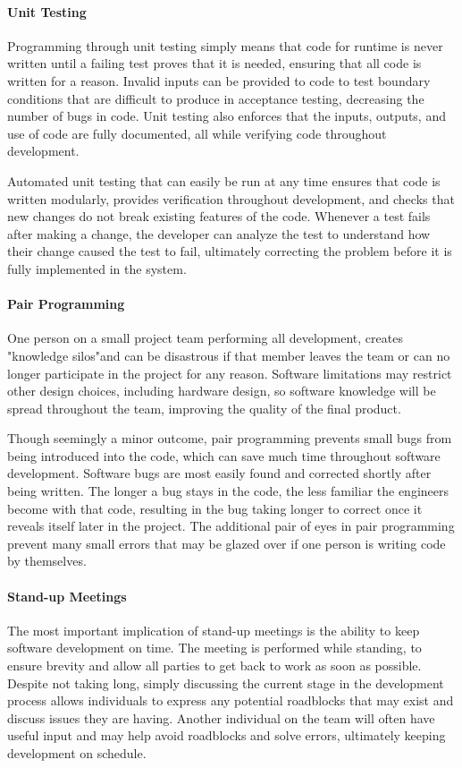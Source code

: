 \paragraph{Unit Testing}
Programming through unit testing simply means that code for runtime is never written until a failing test proves that it is needed, ensuring that all code is written for a reason.
Invalid inputs can be provided to code to test boundary conditions that are difficult to produce in acceptance testing, decreasing the number of bugs in code.
Unit testing also enforces that the inputs, outputs, and use of code are fully documented, all while verifying code throughout development. 

Automated unit testing that can easily be run at any time ensures that code is written modularly, provides verification throughout development, and checks that new changes do not break existing features of the code.
Whenever a test fails after making a change, the developer can analyze the test to understand how their change caused the test to fail, ultimately correcting the problem before it is fully implemented in the system. 
\paragraph{Pair Programming}
One person on a small project team performing all development, creates "knowledge silos"and can be disastrous if that member leaves the team or can no longer participate in the project for any reason.
Software limitations may restrict other design choices, including hardware design, so software knowledge will be spread throughout the team, improving the quality of the final product. 

Though seemingly a minor outcome, pair programming prevents small bugs from being introduced into the code, which can save much time throughout software development.
Software bugs are most easily found and corrected shortly after being written.
The longer a bug stays in the code, the less familiar the engineers become with that code, resulting in the bug taking longer to correct once it reveals itself later in the project.
The additional pair of eyes in pair programming prevent many small errors that may be glazed over if one person is writing code by themselves.
\paragraph{Stand-up Meetings}
The most important implication of stand-up meetings is the ability to keep software development on time.
The meeting is performed while standing, to ensure brevity and allow all parties to get back to work as soon as possible.
Despite not taking long, simply discussing the current stage in the development process allows individuals to express any potential roadblocks that may exist and discuss issues they are having.
Another individual on the team will often have useful input and may help avoid roadblocks and solve errors, ultimately keeping development on schedule. 